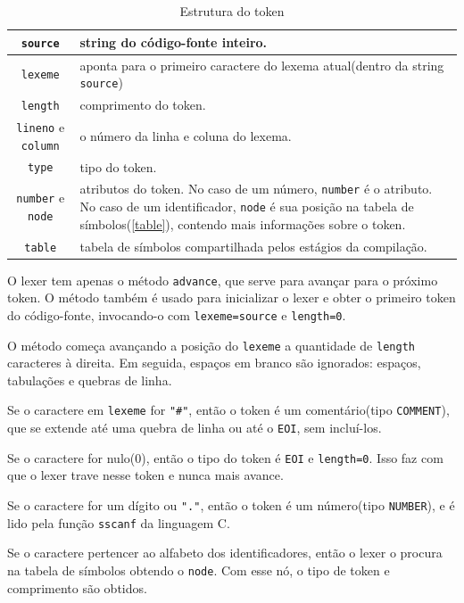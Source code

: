 \begin{table}[ht]
\caption{Estrutura do token}
\label{token}
\begin{centering}
\begin{tabularx}{\textwidth}{||c|X||}
\hline \texttt{source} & string do código-fonte inteiro. \\
\hline \texttt{lexeme} & aponta para o primeiro caractere do lexema atual(dentro da string \texttt{source}) \\
\hline \texttt{length} & comprimento do token. \\
\hline \texttt{lineno} e \texttt{column} & o número da linha e coluna do lexema. \\
\hline \texttt{type} & tipo do token. \\
\hline \texttt{number} e \texttt{node} & atributos do token.
No caso de um número, \texttt{number} é o atributo.
No caso de um identificador, \texttt{node} é sua posição na tabela de símbolos(\ref{table}),
contendo mais informações sobre o token. \\
\hline \texttt{table} & tabela de símbolos compartilhada pelos estágios da compilação. \\
\hline
\end{tabularx}
\end{centering}
\end{table}

O lexer tem apenas o método \texttt{advance}, que serve para avançar
para o próximo token. O método também é usado para inicializar o
lexer e obter o primeiro token do código-fonte,
invocando-o com \texttt{lexeme=source} e \texttt{length=0}.

O método começa avançando a posição do \texttt{lexeme} a quantidade de
\texttt{length} caracteres à direita.
Em seguida, espaços em branco são ignorados: espaços, tabulações e quebras de linha.

Se o caractere em \texttt{lexeme} for \texttt{"\#"}, então o token é um
comentário(tipo \texttt{COMMENT}),
que se extende até uma quebra de linha ou até o \texttt{EOI}, sem incluí-los.

Se o caractere for nulo(0), então o tipo do token é \texttt{EOI} e \texttt{length=0}.
Isso faz com que o lexer trave nesse token e nunca mais avance.

Se o caractere for um dígito ou \texttt{"."}, então o token é um número(tipo \texttt{NUMBER}),
e é lido pela função \texttt{sscanf} da linguagem C.

Se o caractere pertencer ao alfabeto dos identificadores,
então o lexer o procura na tabela de símbolos obtendo o \texttt{node}.
Com esse nó, o tipo de token e comprimento são obtidos.

